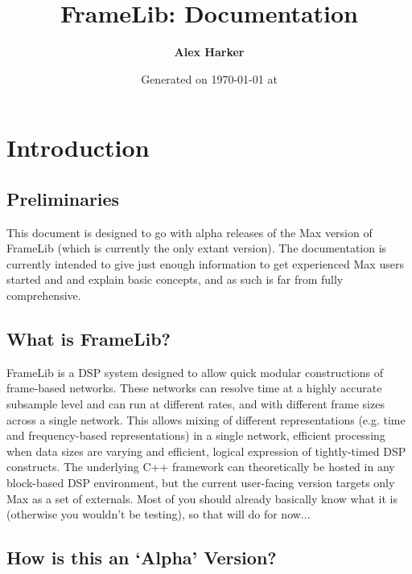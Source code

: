 \documentclass{article}
\title{
\vspace{2in}
\textmd{\textbf{FrameLib: \version{} Documentation}}
\vspace{0.3in}
}
\author{\textbf{Alex Harker}}
\date{Generated on \today{} at \currenttime} %
\begin{document}
\maketitle


\newpage
\tableofcontents
\newpage


\section{Introduction}
\vspace{0.1in}

\subsection{Preliminaries}

This document is designed to go with alpha releases of the Max version of FrameLib (which is currently the only extant version). The documentation is currently intended to give just enough information to get experienced Max users started and and explain basic concepts, and as such is far from fully comprehensive.

\subsection{What is FrameLib?}

FrameLib is a DSP system designed to allow quick modular constructions of frame-based networks. These networks can resolve time at a highly accurate subsample level and can run at different rates, and with different frame sizes across a single network. This allows mixing of different representations (e.g. time and frequency-based representations) in a single network, efficient processing when data sizes are varying and efficient, logical expression of tightly-timed DSP constructs. The underlying C++ framework can theoretically be hosted in any block-based DSP environment, but the current user-facing version targets only Max as a set of externals. Most of you should already basically know what it is (otherwise you wouldn't be testing), so that will do for now...

\subsection{How is this an `Alpha' Version?}
\end{document}
